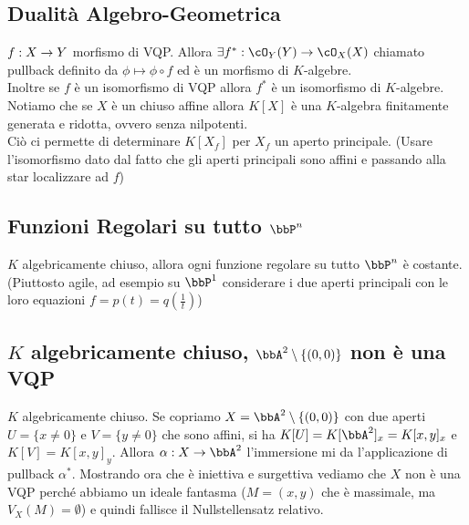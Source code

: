 \documentclass[a4paper,NoNotes,GeneralMath]{stdmdoc}
\begin{document}
	\subsection*{Dualità Algebro-Geometrica}
	$f: X \rightarrow Y$ morfismo di VQP. Allora $\exists f^{*}: \cO_Y(Y) \rar \cO_X(X)$ chiamato pullback definito da $\phi \mapsto \phi \circ f$ ed è un morfismo di $K$-algebre. \\
	Inoltre se $f$ è un isomorfismo di VQP allora $f^{*}$ è un isomorfismo di $K$-algebre.\\
	Notiamo che se $X$ è un chiuso affine allora $K[X]$ è una $K$-algebra finitamente generata e ridotta, ovvero senza nilpotenti. \\
	Ciò ci permette di determinare $K[X_f]$ per $X_f$ un aperto principale. (Usare l'isomorfismo dato dal fatto che gli aperti principali sono affini e passando alla star localizzare ad $f$)
	
	\subsection*{Funzioni Regolari su tutto $\bbP^n$}
	$K$ algebricamente chiuso, allora ogni funzione regolare su tutto $\bbP^n$ è costante. (Piuttosto agile, ad esempio su $\bbP^1$ considerare i due aperti principali con le loro equazioni $f = p(t) = q(\frac{1}{t})$)
	
	\subsection*{$K$ algebricamente chiuso, $\bbA^2 \setminus \{(0,0)\}$ non è una VQP}
	$K$ algebricamente chiuso. Se copriamo $X = \bbA^2 \setminus \{(0,0)\}$ con due aperti $U = \{x \neq 0\}$ e $V = \{y \neq 0\}$ che sono affini, si ha $K[U] = K[\bbA^2]_x = K[x, y]_x$ e $K[V] = K[x,y]_y$. Allora $\alpha: X \rar \bbA^2$ l'immersione mi da l'applicazione di pullback $\alpha^*$. Mostrando ora che è iniettiva e surgettiva vediamo che $X$ non è una VQP perché abbiamo un ideale fantasma ($M = (x,y)$ che è massimale, ma $V_X(M) = \emptyset$) e quindi fallisce il Nullstellensatz relativo.
		
\end{document}
